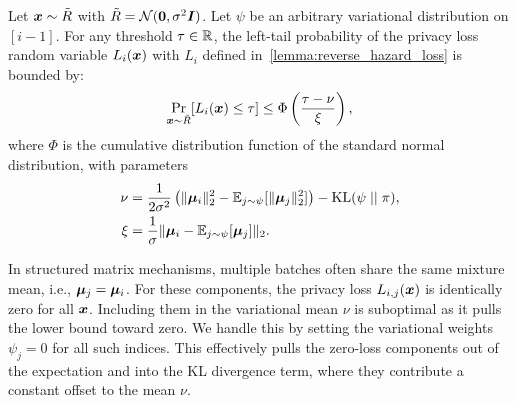 \begin{corollary}\label{thm:add_tail_bound}
    Let ${\bm{x}} \sim \tilde{R}$ with $\tilde{R} = \mathcal{N}({\bm{0}}, \sigma^2 {\bm{I}})$.
    Let $\psi$ be an  arbitrary variational distribution on $[i-1]$.
    For any threshold $\tau \in {\mathbb{R}}$, the left-tail probability of the privacy loss random variable 
    $L_i({\bm{x}})$ with $L_i$ defined in~\cref{lemma:reverse_hazard_loss} is bounded by:
    \begin{equation}
        \Pr_{{\bm{x}} \sim \tilde{R}}[L_i({\bm{x}}) \leq \tau] \leq \Phi\left( \frac{\tau - \nu}{\xi} \right),
    \end{equation}
    where $\Phi$ is the cumulative distribution function of the standard normal distribution, with parameters
    \begin{align*}
        \nu &= \frac{1}{2\sigma^2} \left( \|{\bm{\mu}}_i\|_2^2 - \mathbb{E}_{j \sim \psi}[\|{\bm{\mu}}_j\|_2^2] \right) - \mathrm{KL}(\psi \mid\mid \pi), \\
        \xi &= \frac{1}{\sigma} \| {\bm{\mu}}_i - \mathbb{E}_{j \sim \psi}[{\bm{\mu}}_j] \|_2.
    \end{align*}
\end{corollary}
\begin{remark}
    In structured matrix mechanisms, multiple batches often share the same mixture mean, i.e., ${\bm{\mu}}_j = {\bm{\mu}}_i$. For these components, the privacy loss $L_{i,j}({\bm{x}})$ is identically zero for all ${\bm{x}}$. Including them in the variational mean $\nu$ is suboptimal as it pulls the lower bound toward zero. We handle this by setting the variational weights $\psi_j = 0$ for all such indices. This effectively pulls the zero-loss components out of the expectation and into the KL divergence term, where they contribute a constant offset to the mean $\nu$.
\end{remark}